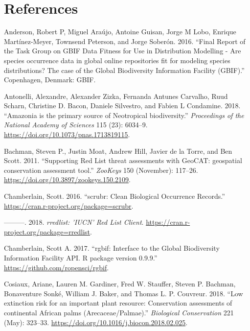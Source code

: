 \documentclass[fleqn,10pt,lineno]{wlpeerj} %
\begin{document}
\newpage{}

\hypertarget{references}{%
\section*{References}\label{references}}

\hypertarget{refs}{}
\leavevmode\hypertarget{ref-Anderson2016}{}%
Anderson, Robert P, Miguel Araújo, Antoine Guisan, Jorge M Lobo, Enrique Martínez-Meyer, Townsend Peterson, and Jorge Soberón. 2016. ``Final Report of the Task Group on GBIF Data Fitness for Use in Distribution Modelling - Are species occurrence data in global online repositories fit for modeling species distributions? The case of the Global Biodiversity Information Facility (GBIF).'' Copenhagen, Denmark: GBIF.

\leavevmode\hypertarget{ref-Antonelli2018}{}%
Antonelli, Alexandre, Alexander Zizka, Fernanda Antunes Carvalho, Ruud Scharn, Christine D. Bacon, Daniele Silvestro, and Fabien L Condamine. 2018. ``Amazonia is the primary source of Neotropical biodiversity.'' \emph{Proceedings of the National Academy of Sciences} 115 (23): 6034--9. \url{https://doi.org/10.1073/pnas.1713819115}.

\leavevmode\hypertarget{ref-Bachman2011}{}%
Bachman, Steven P., Justin Moat, Andrew Hill, Javier de la Torre, and Ben Scott. 2011. ``Supporting Red List threat assessments with GeoCAT: geospatial conservation assessment tool.'' \emph{ZooKeys} 150 (November): 117--26. \url{https://doi.org/10.3897/zookeys.150.2109}.

\leavevmode\hypertarget{ref-Chamberlain2016}{}%
Chamberlain, Scott. 2016. ``scrubr: Clean Biological Occurrence Records.'' \url{https://cran.r-project.org/package=scrubr}.

\leavevmode\hypertarget{ref-Chamberlain2018}{}%
---------. 2018. \emph{rredlist: 'IUCN' Red List Client}. \url{https://cran.r-project.org/package=rredlist}.

\leavevmode\hypertarget{ref-Chamberlain2017}{}%
Chamberlain, Scott A. 2017. ``rgbif: Interface to the Global Biodiversity Information Facility API. R package version 0.9.9.'' \url{https://github.com/ropensci/rgbif}.

\leavevmode\hypertarget{ref-Cosiaux2018}{}%
Cosiaux, Ariane, Lauren M. Gardiner, Fred W. Stauffer, Steven P. Bachman, Bonaventure Sonké, William J. Baker, and Thomas L. P. Couvreur. 2018. ``Low extinction risk for an important plant resource: Conservation assessments of continental African palms (Arecaceae/Palmae).'' \emph{Biological Conservation} 221 (May): 323--33. \url{https://doi.org/10.1016/j.biocon.2018.02.025}.
\end{document}
